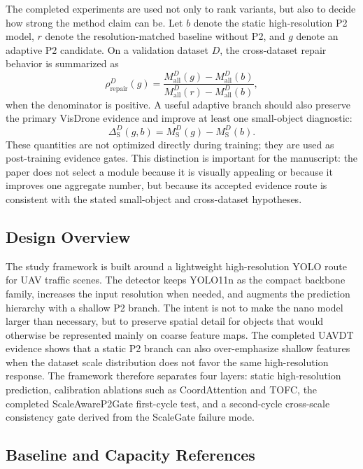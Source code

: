 \documentclass[journal]{IEEEtran}
\begin{document}
The completed experiments are used not only to rank variants, but also to decide how strong the method claim can be. Let \(b\) denote the static high-resolution P2 model, \(r\) denote the resolution-matched baseline without P2, and \(g\) denote an adaptive P2 candidate. On a validation dataset \(D\), the cross-dataset repair behavior is summarized as
\begin{equation}
\rho_{\mathrm{repair}}^{D}(g)=
\frac{M_{\mathrm{all}}^{D}(g)-M_{\mathrm{all}}^{D}(b)}
{M_{\mathrm{all}}^{D}(r)-M_{\mathrm{all}}^{D}(b)} ,
\end{equation}
when the denominator is positive. A useful adaptive branch should also preserve the primary VisDrone evidence and improve at least one small-object diagnostic:
\begin{equation}
\Delta_{\mathrm{S}}^{D}(g,b)=M_{\mathrm{S}}^{D}(g)-M_{\mathrm{S}}^{D}(b).
\end{equation}
These quantities are not optimized directly during training; they are used as post-training evidence gates. This distinction is important for the manuscript: the paper does not select a module because it is visually appealing or because it improves one aggregate number, but because its accepted evidence route is consistent with the stated small-object and cross-dataset hypotheses.

\subsection{Design Overview}

The study framework is built around a lightweight high-resolution YOLO route for UAV traffic scenes. The detector keeps YOLO11n as the compact backbone family, increases the input resolution when needed, and augments the prediction hierarchy with a shallow P2 branch. The intent is not to make the nano model larger than necessary, but to preserve spatial detail for objects that would otherwise be represented mainly on coarse feature maps. The completed UAVDT evidence shows that a static P2 branch can also over-emphasize shallow features when the dataset scale distribution does not favor the same high-resolution response. The framework therefore separates four layers: static high-resolution prediction, calibration ablations such as CoordAttention and TOFC, the completed ScaleAwareP2Gate first-cycle test, and a second-cycle cross-scale consistency gate derived from the ScaleGate failure mode.

\subsection{Baseline and Capacity References}
\end{document}
